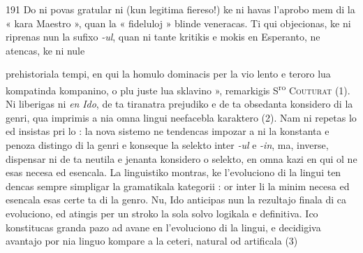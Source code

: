 \begin{VUpage}[195]{191}
{Do ni povas gratular ni (kun legitima fiereso!) ke ni havas\nl
l'aprobo mem di la « kara Maestro », quan la « fideluloj » blinde\nl
veneracas. Ti qui objecionas, ke ni riprenas nun la sufixo \textit{-ul}, quan\nl
ni tante kritikis e mokis en Esperanto, ne atencas, ke ni nule\parplein
}

\VUcontinue
prehistoriala tempi, en qui la homulo dominacis per la vio\cc
lento e teroro lua kompatinda kompanino, o plu juste lua\nl
sklavino », remarkigis S\textsuperscript{ro} \textsc{Couturat} (1). Ni liberigas ni \textit{en}\nl
\textit{Ido}, de ta tiranatra prejudiko e de ta obsedanta konsidero\nl
di la genri, qua imprimis a nia omna lingui neefacebla\nl
karaktero (2). Nam ni repetas lo ed insistas pri lo : la nova\nl
sistemo ne tendencas impozar a ni la konstanta e penoza\nl
distingo di la genri e konseque la selekto inter \textit{-ul} e \textit{-in},\nl
ma, inverse, dispensar ni de ta neutila e jenanta konsidero\nl
o selekto, en omna kazi en qui ol ne esas necesa ed esencala.\nl
La linguistiko montras, ke l'evoluciono di la lingui ten\cc
dencas sempre simpligar la gramatikala kategorii : or inter\nl
li la minim necesa ed esencala esas certe ta di la genro.\nl
Nu, Ido anticipas nun la rezultajo finala di ca evoluciono,\nl
ed atingis per un stroko la sola solvo logikala e definitiva.\nl
Ico konstitucas granda pazo ad avane en l'evoluciono di la\nl
lingui, e decidigiva avantajo por nia linguo kompare a la\nl
ceteri, natural od artificala (3)
\end{VUpage}

